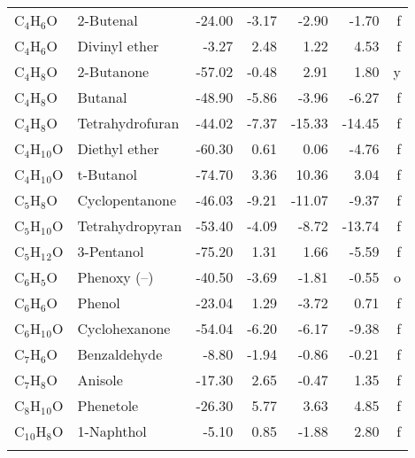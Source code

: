 \begin{table}
\begin{center}
\begin{tabular}{llrrrrr}
 C$_4$H$_6$O       & 2-Butenal                       &   -24.00    &    -3.17  &    -2.90  &    -1.70  &      f\\
 C$_4$H$_6$O       & Divinyl ether                   &    -3.27    &     2.48  &     1.22  &     4.53  &      f\\
 C$_4$H$_8$O       & 2-Butanone                      &   -57.02    &    -0.48  &     2.91  &     1.80  &      y\\
 C$_4$H$_8$O       & Butanal                         &   -48.90    &    -5.86  &    -3.96  &    -6.27  &      f\\
 C$_4$H$_8$O       & Tetrahydrofuran                 &   -44.02    &    -7.37  &   -15.33  &   -14.45  &      f\\
 C$_4$H$_1$$_0$O      & Diethyl ether                   &   -60.30    &     0.61  &     0.06  &    -4.76  &      f\\
 C$_4$H$_1$$_0$O      & t-Butanol                       &   -74.70    &     3.36  &    10.36  &     3.04  &      f\\
 C$_5$H$_8$O       & Cyclopentanone                  &   -46.03    &    -9.21  &   -11.07  &    -9.37  &      f\\
 C$_5$H$_1$$_0$O      & Tetrahydropyran                 &   -53.40    &    -4.09  &    -8.72  &   -13.74  &      f\\
 C$_5$H$_1$$_2$O      & 3-Pentanol                      &   -75.20    &     1.31  &     1.66  &    -5.59  &      f\\
 C$_6$H$_5$O       & Phenoxy (--)                     &   -40.50    &    -3.69  &    -1.81  &    -0.55  &      o\\
 C$_6$H$_6$O       & Phenol                          &   -23.04    &     1.29  &    -3.72  &     0.71  &      f\\
 C$_6$H$_1$$_0$O      & Cyclohexanone                   &   -54.04    &    -6.20  &    -6.17  &    -9.38  &      f\\
 C$_7$H$_6$O       & Benzaldehyde                    &    -8.80    &    -1.94  &    -0.86  &    -0.21  &      f\\
 C$_7$H$_8$O       & Anisole                         &   -17.30    &     2.65  &    -0.47  &     1.35  &      f\\
 C$_8$H$_1$$_0$O      & Phenetole                       &   -26.30    &     5.77  &     3.63  &     4.85  &      f\\
 C$_1$$_0$H$_8$O      & 1-Naphthol                      &    -5.10    &     0.85  &    -1.88  &     2.80  &      f\\
$$
\end{tabular}
\end{center}
\end{table}
